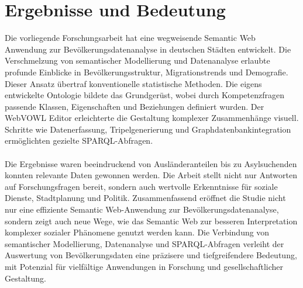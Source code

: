 \documentclass[a4paper, 12pt]{article}
\begin{document}
\section{Ergebnisse und Bedeutung}
Die vorliegende Forschungsarbeit hat eine wegweisende Semantic Web Anwendung zur Bevölkerungsdatenanalyse in deutschen Städten entwickelt. Die Verschmelzung von semantischer Modellierung und Datenanalyse erlaubte profunde Einblicke in Bevölkerungsstruktur, Migrationstrends und Demografie. Dieser Ansatz übertraf konventionelle statistische Methoden. Die eigens entwickelte Ontologie bildete das Grundgerüst, wobei durch Kompetenzfragen passende Klassen, Eigenschaften und Beziehungen definiert wurden. Der WebVOWL Editor erleichterte die Gestaltung komplexer Zusammenhänge visuell. Schritte wie Datenerfassung, Tripelgenerierung und Graphdatenbankintegration ermöglichten gezielte SPARQL-Abfragen.
\\ \\
Die Ergebnisse waren beeindruckend von Ausländeranteilen bis zu Asylsuchenden konnten relevante Daten gewonnen werden. Die Arbeit stellt nicht nur Antworten auf Forschungsfragen bereit, sondern auch wertvolle Erkenntnisse für soziale Dienste, Stadtplanung und Politik. Zusammenfassend eröffnet die Studie nicht nur eine effiziente Semantic Web-Anwendung zur \newline Bevölkerungsdatenanalyse, sondern zeigt auch neue Wege, wie das Semantic Web zur besseren Interpretation komplexer sozialer Phänomene genutzt werden kann. Die Verbindung von semantischer Modellierung, Datenanalyse und SPARQL-Abfragen verleiht der Auswertung von Bevölkerungsdaten eine präzisere und tiefgreifendere Bedeutung, mit Potenzial für vielfältige Anwendungen in Forschung und gesellschaftlicher Gestaltung.
\end{document}
